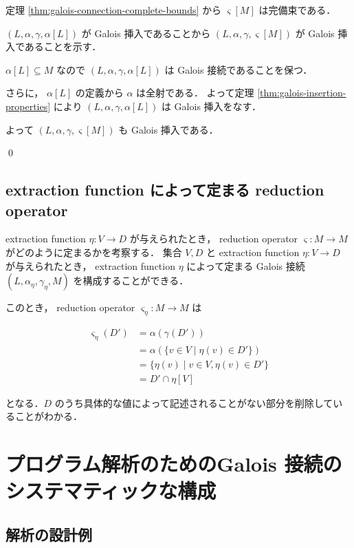 \documentclass[uplatex]{jsarticle}
\begin{document}
定理 \ref{thm:galois-connection-complete-bounds} から $\varsigma [ M ]$ は完備束である．

$(L, \alpha, \gamma, \alpha[ L ])$ が Galois 挿入であることから $(L, \alpha, \gamma, \varsigma [ M ])$ が Galois 挿入であることを示す．

$\alpha[ L ] \subseteq M$ なので $(L, \alpha, \gamma, \alpha [ L ])$ は Galois 接続であることを保つ．

さらに， $\alpha [ L ]$ の定義から $\alpha$ は全射である．
よって定理 \ref{thm:galois-insertion-properties} により
$(L, \alpha, \gamma, \alpha [ L ])$ は Galois 挿入をなす．

よって $(L, \alpha, \gamma, \varsigma [ M ])$ も Galois 挿入である．

\qed

\subsection{extraction function によって定まる reduction operator}

extraction function $\eta: V \to D$ が与えられたとき， reduction operator $\varsigma: M \to M$ がどのように定まるかを考察する．
集合 $V, D$ と extraction function $\eta: V \to D$ が与えられたとき，
extraction function $\eta$ によって定まる Galois 接続 $(L, \alpha_\eta, \gamma_\eta, M)$ を構成することができる．

このとき， reduction operator $\varsigma_\eta: M \to M$ は

\begin{align*}
  \varsigma_\eta(D') & = \alpha(\gamma(D'))                                     \\
                     & = \alpha\left( \{ v \in V \mid \eta(v) \in D' \} \right) \\
                     & = \{ \eta(v) \mid v \in V, \eta(v) \in D' \}             \\
                     & = D' \cap \eta [ V ]
\end{align*}

となる．$D$ のうち具体的な値によって記述されることがない部分を削除していることがわかる．


\section{プログラム解析のためのGalois 接続のシステマティックな構成}

\subsection{解析の設計例}
\end{document}
